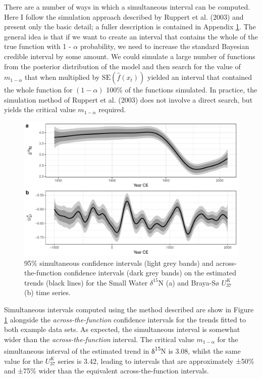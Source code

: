 \documentclass[12pt,]{article}
\newcommand{\uk}{\ensuremath{\mathit{U}^{\mathit{K}}_{\mathup{37}}}}
\begin{document}
There are a number of ways in which a simultaneous interval can be
computed. Here I follow the simulation approach described by Ruppert et
al. (2003) and present only the basic detail; a fuller description is
contained in Appendix \protect\hyperlink{appendix}{1}. The general idea
is that if we want to create an interval that contains the whole of the
true function with 1 - \(\alpha\) probability, we need to increase the
standard Bayesian credible interval by some amount. We could simulate a
large number of functions from the posterior distribution of the model
and then search for the value of \(m_{1-\alpha}\) that when multiplied
by \(\text{SE}(\hat{f}(x_t))\) yielded an interval that contained the
whole function for \((1-\alpha)\) 100\% of the functions simulated. In
practice, the simulation method of Ruppert et al. (2003) does not
involve a direct search, but yields the critical value \(m_{1-\alpha}\)
required.

\begin{figure}

{\centering \includegraphics[width=0.8\linewidth]{manuscript_files/figure-latex/compare-intervals-1} 

}

\caption{95\% simultaneous confidence intervals (light grey bands) and across-the-function confidence intervals (dark grey bands) on the estimated trends (black lines) for the Small Water $\delta^{15}\text{N}$ (a) and Braya-Sø \uk{} (b) time series.}\label{fig:compare-intervals}
\end{figure}

Simultaneous intervals computed using the method described are show in
Figure \ref{fig:compare-intervals} alongside the
\emph{across-the-function} confidence intervals for the trends fitted to
both example data sets. As expected, the simultaneous interval is
somewhat wider than the \emph{across-the-function} interval. The
critical value \(m_{1-\alpha}\) for the simultaneous interval of the
estimated trend in δ\textsuperscript{15}N is 3.08, whilst the same value
for the \uk{} series is 3.42, leading to intervals that are
approximately ±50\% and ±75\% wider than the equivalent
across-the-function intervals.
\end{document}
